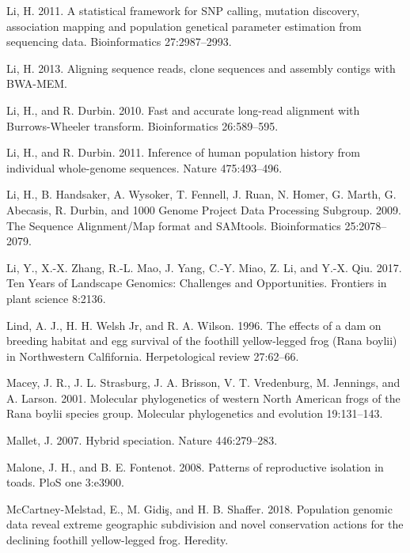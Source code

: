 \documentclass[proquest,12pt,final]{ucthesis-CA2012} %
\begin{document}
\begin{ucmainmatter}
\leavevmode\hypertarget{ref-li_statistical_2011}{}%
Li, H. 2011. A statistical framework for SNP calling, mutation
discovery, association mapping and population genetical parameter
estimation from sequencing data. Bioinformatics 27:2987--2993.

\leavevmode\hypertarget{ref-li_aligning_2013}{}%
Li, H. 2013. Aligning sequence reads, clone sequences and assembly
contigs with BWA-MEM.

\leavevmode\hypertarget{ref-li_fast_2010}{}%
Li, H., and R. Durbin. 2010. Fast and accurate long-read alignment with
Burrows-Wheeler transform. Bioinformatics 26:589--595.

\leavevmode\hypertarget{ref-li_inference_2011}{}%
Li, H., and R. Durbin. 2011. Inference of human population history from
individual whole-genome sequences. Nature 475:493--496.

\leavevmode\hypertarget{ref-li_sequence_2009}{}%
Li, H., B. Handsaker, A. Wysoker, T. Fennell, J. Ruan, N. Homer, G.
Marth, G. Abecasis, R. Durbin, and 1000 Genome Project Data Processing
Subgroup. 2009. The Sequence Alignment/Map format and SAMtools.
Bioinformatics 25:2078--2079.

\leavevmode\hypertarget{ref-li_ten_2017}{}%
Li, Y., X.-X. Zhang, R.-L. Mao, J. Yang, C.-Y. Miao, Z. Li, and Y.-X.
Qiu. 2017. Ten Years of Landscape Genomics: Challenges and
Opportunities. Frontiers in plant science 8:2136.

\leavevmode\hypertarget{ref-lind_effects_1996}{}%
Lind, A. J., H. H. Welsh Jr, and R. A. Wilson. 1996. The effects of a
dam on breeding habitat and egg survival of the foothill yellow-legged
frog (Rana boylii) in Northwestern Calfifornia. Herpetological review
27:62--66.

\leavevmode\hypertarget{ref-macey_molecular_2001}{}%
Macey, J. R., J. L. Strasburg, J. A. Brisson, V. T. Vredenburg, M.
Jennings, and A. Larson. 2001. Molecular phylogenetics of western North
American frogs of the Rana boylii species group. Molecular phylogenetics
and evolution 19:131--143.

\leavevmode\hypertarget{ref-mallet_hybrid_2007}{}%
Mallet, J. 2007. Hybrid speciation. Nature 446:279--283.

\leavevmode\hypertarget{ref-malone_patterns_2008}{}%
Malone, J. H., and B. E. Fontenot. 2008. Patterns of reproductive
isolation in toads. PloS one 3:e3900.

\leavevmode\hypertarget{ref-mccartney-melstad_population_2018}{}%
McCartney-Melstad, E., M. Gidiş, and H. B. Shaffer. 2018. Population
genomic data reveal extreme geographic subdivision and novel
conservation actions for the declining foothill yellow-legged frog.
Heredity.


\end{ucmainmatter}
\end{document}
